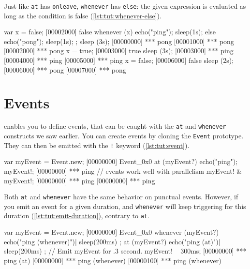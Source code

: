 Just like \lstinline|at| has \lstinline|onleave|, \lstinline|whenever|
has \lstinline|else|: the given expression is evaluated as long as the
condition is false (\autoref{lst:tut:whenever-else}).

\begin{urbiscript}[caption=Using \lstinline{whenever ... else},
  label=lst:tut:whenever-else]
var x = false;
[00002000] false
whenever (x)
{
  echo("ping");
  sleep(1s);
}
else
{
  echo("pong");
  sleep(1s);
};
sleep (3s);
[00000000] *** pong
[00001000] *** pong
[00002000] *** pong
x = true;
[00003000] true
sleep (3s);
[00003000] *** ping
[00004000] *** ping
[00005000] *** ping
x = false;
[00006000] false
sleep (2s);
[00006000] *** pong
[00007000] *** pong
\end{urbiscript}

\section{Events}
\label{sec:tut:events}
\us enables you to define events, that can be caught with the
\lstinline|at| and \lstinline|whenever| constructs we saw earlier. You
can create events by cloning the \lstinline|Event| prototype. They can
then be emitted with the \lstinline|!| keyword (\autoref{lst:tut:event}).

\begin{urbiscript}[caption=Using events, label=lst:tut:event]
var myEvent = Event.new;
[00000000] Event_0x0
at (myEvent?)
  echo("ping");
myEvent!;
[00000000] *** ping
// events work well with parallelism
myEvent! & myEvent!;
[00000000] *** ping
[00000000] *** ping
\end{urbiscript}

Both \lstinline|at| and \lstinline|whenever| have the same behavior on
punctual events. However, if you emit an event for a given duration,
and \lstinline|whenever| will keep triggering for this duration
(\autoref{lst:tut:emit-duration}), contrary to \lstinline|at|.

\begin{urbiscript}[caption=Emitting events with a duration,
  label=lst:tut:emit-duration]
var myEvent = Event.new;
[00000000] Event_0x0
whenever (myEvent?)
{
  echo("ping (whenever)")|
  sleep(200ms)
};
at (myEvent?)
{
  echo("ping (at)")|
  sleep(200ms)
};
// Emit myEvent for .3 second.
myEvent! ~ 300ms;
[00000000] *** ping (at)
[00000000] *** ping (whenever)
[00000100] *** ping (whenever)
\end{urbiscript}

